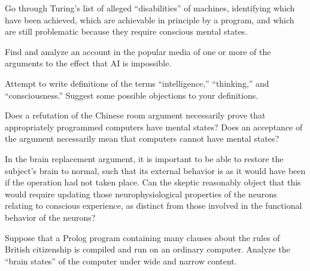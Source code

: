 
\begin{exercise}%
Go through Turing's list of alleged
``disabilities'' of machines, identifying which
have been achieved, which are achievable in principle by
a program, and which are still problematic because they require
conscious mental states.
\end{exercise} 

\begin{uexercise}
Find and analyze an account in the popular media of one or
more of the arguments to the effect that AI is impossible.
\end{uexercise} 

\begin{iexercise}
Attempt to write definitions of the terms ``intelligence,'' ``thinking,'' and
``consciousness.''  Suggest some possible objections to your definitions.
\end{iexercise} 



\begin{iexercise}
Does a refutation of the Chinese room argument
necessarily prove that appropriately programmed computers have mental
states?  Does an acceptance of the argument necessarily mean that
computers cannot have mental states?
\end{iexercise} 

\begin{exercise}%
In the brain replacement argument, it is
important to be able to restore the subject's brain to normal, such
that its external behavior is as it would have been if the operation
had not taken place. Can the skeptic reasonably object that this would
require updating those neurophysiological properties of the neurons
relating to conscious experience, as distinct from those involved in
the functional behavior of the neurons?
\end{exercise} 

\begin{uexercise}
Suppose that a Prolog program containing many clauses about the rules of British citizenship
is compiled and run on an ordinary computer. Analyze 
the ``brain states'' of the computer under wide and narrow content.
\end{uexercise} 


